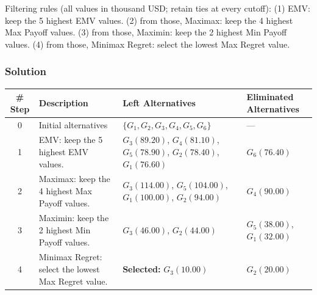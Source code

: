 Filtering rules (all values in thousand USD; retain ties at every cutoff):
(1) EMV: keep the 5 highest EMV values.
(2) from those, Maximax: keep the 4 highest Max Payoff values.
(3) from those, Maximin: keep the 2 highest Min Payoff values.
(4) from those, Minimax Regret: select the lowest Max Regret value.


\subsubsection*{Solution}
\label{subsec:c9-finance-solution}
\begin{center}
\small
\begin{tabularx}{\textwidth}{@{}c >{\raggedright\arraybackslash}X >{\raggedright\arraybackslash}p{} >{\raggedright\arraybackslash}p{}@{}}
\toprule
\# Step & Description & Left Alternatives & Eliminated Alternatives \\
\midrule
0 & Initial alternatives & $\{G_1,G_2,G_3,G_4,G_5,G_6\}$ & --- \\
1 & EMV: keep the 5 highest EMV values. & $G_3(89.20)$, $G_4(81.10)$, $G_5(78.90)$, $G_2(78.40)$, $G_1(76.60)$ & $G_6(76.40)$ \\
2 & Maximax: keep the 4 highest Max Payoff values. & $G_3(114.00)$, $G_5(104.00)$, $G_1(100.00)$, $G_2(94.00)$ & $G_4(90.00)$ \\
3 & Maximin: keep the 2 highest Min Payoff values. & $G_3(46.00)$, $G_2(44.00)$ & $G_5(38.00)$, $G_1(32.00)$ \\
4 & Minimax Regret: select the lowest Max Regret value. & \textbf{Selected:} $G_3(10.00)$ & $G_2(20.00)$ \\
\bottomrule
\end{tabularx}
\end{center}

